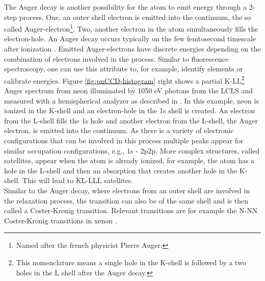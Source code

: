 %
The Auger decay is another possibility for the atom to emit energy through a 2-step process. One, an outer shell electron is emitted into the continuum, the so called Auger-electron\footnote{Named after the french physicist Pierre Auger.}. Two, another electron in the atom simultaneously fills the electron-hole. An Auger decay occurs typically on the few femtosecond timescale after ionization \citep{Krause-1970-PhysLettA}. Emitted Auger-electrons have discrete energies depending on the combination of electrons involved in the process. Similar to fluorescence spectroscopy, one can use this attribute to, for example, identify elements or calibrate energies. Figure \ref{fig:pnCCD-histogram} right shows a partial K-LL\footnote{This nomenclature means a single hole in the K-shell is followed by a two holes in the L shell after the Auger decay.} Auger spectrum from neon illuminated by 1050 eV photons from the LCLS and measured with a hemispherical analyzer as described in \citep{Bucher-2014-Unpublished}. In this example, neon is ionized in the K-shell and an electron-hole in the 1s shell is created. An electron from the L-shell fills the 1s hole and another electron from the L-shell, the Auger electron, is emitted into the continuum. As there is a variety of electronic configurations that can be involved in this process multiple peaks appear for similar occupation configurations, e.g., 1s - 2p2p. More complex structures, called satellites, appear when the atom is already ionized, for example, the atom has a hole in the L-shell and then an absorption that creates another hole in the K-shell. This will lead to KL-LLL satellites.\\
Similar to the Auger decay, where electrons from an outer shell are involved in the relaxation process, the transition can also be of the same shell and is then called a Coster-Kronig transition. Relevant transitions are for example the N-NN Coster-Kronig transitions in xenon \citep{Coster-1935-Physica}.
%
%
%
%
